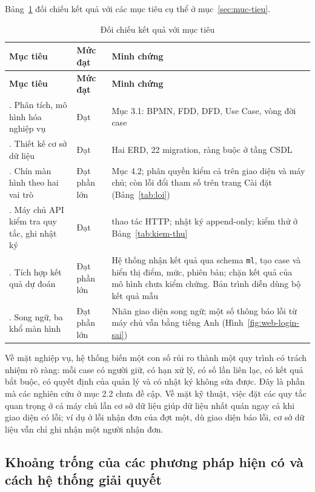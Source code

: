 Bảng~\ref{tab:doi-chieu} đối chiếu kết quả với các mục tiêu cụ thể ở mục~\ref{sec:muc-tieu}.

{\small
\renewcommand{\arraystretch}{1.25}
\begin{longtable}{|>{\raggedright\arraybackslash}p{4.4cm}|>{\raggedright\arraybackslash}p{2cm}|>{\raggedright\arraybackslash}p{8cm}|}
\caption{Đối chiếu kết quả với mục tiêu}\label{tab:doi-chieu}\\ \hline
\textbf{Mục tiêu} & \textbf{Mức đạt} & \textbf{Minh chứng} \\ \hline \endfirsthead
\hline \textbf{Mục tiêu} & \textbf{Mức đạt} & \textbf{Minh chứng} \\ \hline \endhead
1. Phân tích, mô hình hóa nghiệp vụ & Đạt & Mục 3.1: BPMN, FDD, DFD, Use Case, vòng đời case \\ \hline
2. Thiết kế cơ sở dữ liệu & Đạt & Hai ERD, 22 migration, ràng buộc ở tầng CSDL \\ \hline
3. Chín màn hình theo hai vai trò & Đạt phần lớn & Mục 4.2; phân quyền kiểm cả trên giao diện và máy chủ; còn lỗi đổi tham số trên trang Cài đặt (Bảng~\ref{tab:loi}) \\ \hline
4. Máy chủ API kiểm tra quy tắc, ghi nhật ký & Đạt & 28 thao tác HTTP; nhật ký append-only; kiểm thử ở Bảng~\ref{tab:kiem-thu} \\ \hline
5. Tích hợp kết quả dự đoán & Đạt phần lớn & Hệ thống nhận kết quả qua schema \texttt{ml}, tạo case và hiển thị điểm, mức, phiên bản; chặn kết quả của mô hình chưa kiểm chứng. Bản trình diễn dùng bộ kết quả mẫu \\ \hline
6. Song ngữ, ba khổ màn hình & Đạt phần lớn & Nhãn giao diện song ngữ; một số thông báo lỗi từ máy chủ vẫn bằng tiếng Anh (Hình~\ref{fig:web-login-sai}) \\ \hline
\end{longtable}
}

Về mặt nghiệp vụ, hệ thống biến một con số rủi ro thành một quy trình có trách nhiệm rõ ràng: mỗi
case có người giữ, có hạn xử lý, có số lần liên lạc, có kết quả bắt buộc, có quyết định của quản lý
và có nhật ký không sửa được. Đây là phần mà các nghiên cứu ở mục 2.2 chưa đề cập. Về mặt kỹ thuật,
việc đặt các quy tắc quan trọng ở cả máy chủ lẫn cơ sở dữ liệu giúp dữ liệu nhất quán ngay cả khi
giao diện có lỗi; ví dụ ở lỗi nhận đơn của đợt một, dù giao diện báo lỗi, cơ sở dữ liệu vẫn chỉ ghi nhận một người nhận
đơn.

\subsection{Khoảng trống của các phương pháp hiện có và cách hệ thống giải quyết}

